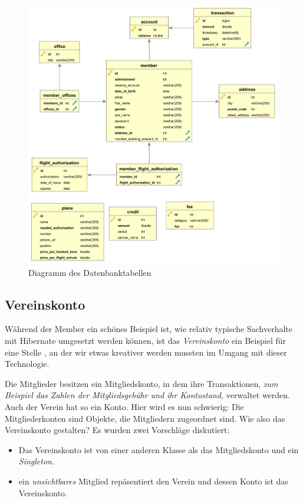 \documentclass[a4paper, 11pt]{article}
\begin{document}
\begin{figure}[htpb]
    \centering
    \includegraphics[width=\textwidth]{images/erm/all_orthogonal.png}
    \caption{Diagramm des Datenbanktabellen}
    \label{fig:erm_all}
\end{figure}

\subsection{Vereinskonto}

Während der Member ein schönes Beispiel ist, wie relativ typische Sachverhalte
mit Hibernate umgesetzt werden können, ist das \emph{Vereinskonto} ein Beispiel
für eine Stelle , an der wir etwas kreativer werden mussten im Umgang mit
dieser Technologie.

Die Mitglieder besitzen ein Mitgliedskonto, in dem ihre Transaktionen, \emph{zum
Beispiel das Zahlen der Mitgliedsgebühr und ihr Kontostand,} verwaltet werden.
Auch der Verein hat so ein Konto. Hier wird es nun schwierig: Die
Mitgliederkonten sind Objekte, die Mitgliedern zugeordnet sind. Wie also das
Vereinskonto gestalten? Es wurden zwei Vorschläge diskutiert:

\begin{itemize}
    \item Das Vereinskonto ist von einer anderen Klasse als das Mitgliedskonto
        und ein \emph{Singleton}.
    \item ein \emph{unsichtbares} Mitglied repäsentiert den Verein und dessen
        Konto ist das Vereinskonto.
\end{itemize}
\end{document}
